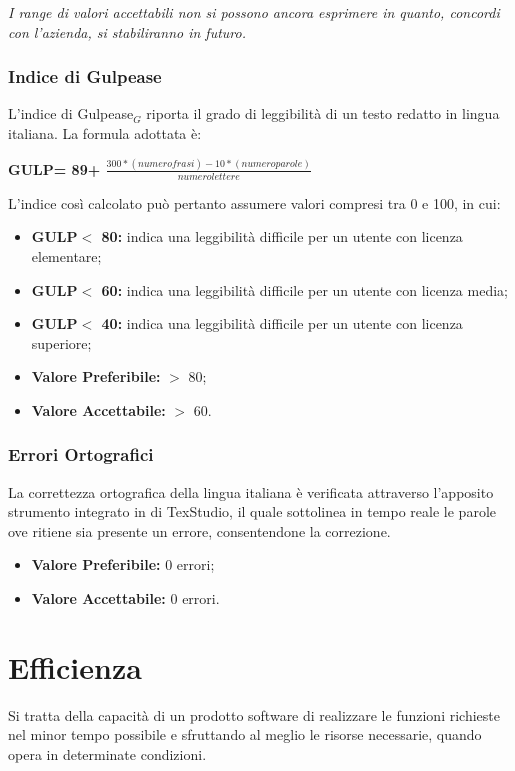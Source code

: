 \textit{I range di valori accettabili non si possono ancora esprimere in quanto, concordi con l'azienda, si stabiliranno in futuro.}
\subsubsection{Indice di Gulpease} \label{QualitàDelProdottoUsabilitàMetricheIndiceDiGulpease}
L’indice di Gulpease$_G$ riporta il grado di leggibilità di un testo redatto in lingua italiana.
La formula adottata è:
\begin{center}
	\textbf{GULP= 89+ $\frac{300*(numero frasi)-10*(numero parole)}{numero lettere}$}
\end{center}
L'indice così calcolato può pertanto assumere valori compresi tra 0 e 100, in cui:
\begin{itemize}
	\item \textbf{GULP$<$ 80:} indica una leggibilità difficile per un utente con licenza elementare;
	\item \textbf{GULP$<$ 60:} indica una leggibilità difficile per un utente con licenza media;
	\item \textbf{GULP$<$ 40:} indica una leggibilità difficile per un utente con licenza superiore;
	\item \textbf{Valore Preferibile:} $>$ 80;
	\item \textbf{Valore  Accettabile:} $>$ 60.
\end{itemize}
\subsubsection{Errori Ortografici} \label{QualitàDelProdottoUsabilitàMetricheErroriOrtografici}
La correttezza ortografica della lingua italiana è verificata attraverso l’apposito strumento integrato in di TexStudio, il quale sottolinea in tempo reale le parole ove ritiene sia presente un errore, consentendone la correzione.
\begin{itemize}
	\item \textbf{Valore Preferibile:} 0 errori;
	\item \textbf{Valore  Accettabile:} 0 errori.
\end{itemize}

\section{Efficienza} \label{QualitàDelProdottoEfficienza}
Si tratta della capacità di un prodotto software di realizzare le funzioni richieste nel minor tempo possibile e sfruttando al meglio le risorse necessarie, quando opera in determinate condizioni.

